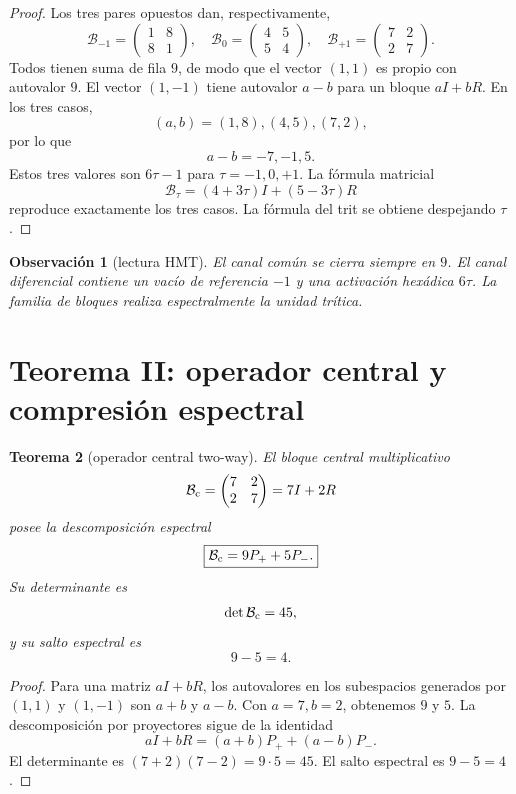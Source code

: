 \documentclass[11pt,a4paper]{article}
\newtheorem{teorema}{Teorema}
\newtheorem{observacion}[teorema]{Observaci\'on}
\newcommand{\Bc}{\mathcal B_{\rm c}}
\begin{document}
\begin{proof}
Los tres pares opuestos dan, respectivamente,
\[
\mathcal B_{-1}=\begin{pmatrix}1&8\\8&1\end{pmatrix},\quad
\mathcal B_{0}=\begin{pmatrix}4&5\\5&4\end{pmatrix},\quad
\mathcal B_{+1}=\begin{pmatrix}7&2\\2&7\end{pmatrix}.
\]
Todos tienen suma de fila \(9\), de modo que el vector \((1,1)\) es propio con autovalor \(9\). El vector \((1,-1)\) tiene autovalor \(a-b\) para un bloque \(aI+bR\). En los tres casos,
\[
(a,b)=(1,8),(4,5),(7,2),
\]
por lo que
\[
a-b=-7,-1,5.
\]
Estos tres valores son \(6\tau-1\) para \(\tau=-1,0,+1\). La f\'ormula matricial
\[
\mathcal B_\tau=(4+3\tau)I+(5-3\tau)R
\]
reproduce exactamente los tres casos. La f\'ormula del trit se obtiene despejando \(\tau\).
\end{proof}

\begin{observacion}[lectura HMT]
El canal com\'un se cierra siempre en \(9\). El canal diferencial contiene un vac\'io de referencia \(-1\) y una activaci\'on hex\'adica \(6\tau\). La familia de bloques realiza espectralmente la unidad tr\'itica.
\end{observacion}

\section{Teorema II: operador central y compresi\'on espectral}

\begin{teorema}[operador central two-way]
El bloque central multiplicativo
\[
\Bc=\begin{pmatrix}7&2\\2&7\end{pmatrix}=7I+2R
\]
posee la descomposici\'on espectral
\[
\boxed{\Bc=9P_+ +5P_-.}
\]
Su determinante es
\[
\det\Bc=45,
\]
y su salto espectral es
\[
9-5=4.
\]
\end{teorema}

\begin{proof}
Para una matriz \(aI+bR\), los autovalores en los subespacios generados por \((1,1)\) y \((1,-1)\) son \(a+b\) y \(a-b\). Con \(a=7,b=2\), obtenemos \(9\) y \(5\). La descomposici\'on por proyectores sigue de la identidad
\[
aI+bR=(a+b)P_++(a-b)P_-.
\]
El determinante es \((7+2)(7-2)=9\cdot5=45\). El salto espectral es \(9-5=4\).
\end{proof}
\end{document}
